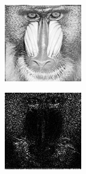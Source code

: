 \begin{figure}
\centering
        \begin{subfigure}{0.4\textwidth}\centering
                    \includegraphics[width=\linewidth]{mandrill1.png}
       \end{subfigure}%
        \begin{subfigure}{0.4\textwidth}\centering
                    \includegraphics[width=\linewidth]{mandrill2.png}

\end{subfigure}
\end{figure}

